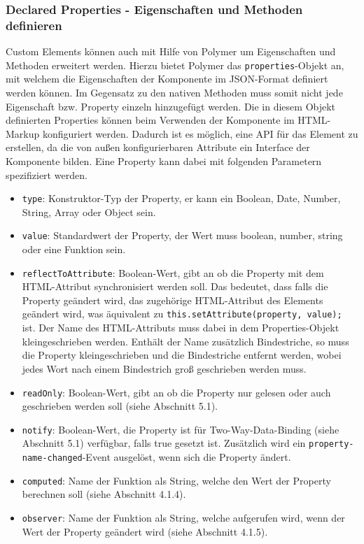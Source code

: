 \documentclass[]{article}
\providecommand{\tightlist}{%
  \setlength{\itemsep}{0pt}\setlength{\parskip}{0pt}}
\begin{document}
\subsubsection{Declared Properties - Eigenschaften und Methoden
definieren}\label{declared-properties---eigenschaften-und-methoden-definieren}

Custom Elements können auch mit Hilfe von Polymer um Eigenschaften und
Methoden erweitert werden. Hierzu bietet Polymer das
\texttt{properties}-Objekt an, mit welchem die Eigenschaften der
Komponente im JSON-Format definiert werden können. Im Gegensatz zu den
nativen Methoden muss somit nicht jede Eigenschaft bzw. Property einzeln
hinzugefügt werden. Die in diesem Objekt definierten Properties können
beim Verwenden der Komponente im HTML-Markup konfiguriert werden.
Dadurch ist es möglich, eine API für das Element zu erstellen, da die
von außen konfigurierbaren Attribute ein Interface der Komponente
bilden. Eine Property kann dabei mit folgenden Parametern spezifiziert
werden.

\begin{itemize}
\tightlist
\item
  \texttt{type}: Konstruktor-Typ der Property, er kann ein Boolean,
  Date, Number, String, Array oder Object sein.
\item
  \texttt{value}: Standardwert der Property, der Wert muss boolean,
  number, string oder eine Funktion sein.
\item
  \texttt{reflectToAttribute}: Boolean-Wert, gibt an ob die Property mit
  dem HTML-Attribut synchronisiert werden soll. Das bedeutet, dass falls
  die Property geändert wird, das zugehörige HTML-Attribut des Elements
  geändert wird, was äquivalent zu
  \texttt{this.setAttribute(property,\ value);} ist. Der Name des
  HTML-Attributs muss dabei in dem Properties-Objekt kleingeschrieben
  werden. Enthält der Name zusätzlich Bindestriche, so muss die Property
  kleingeschrieben und die Bindestriche entfernt werden, wobei jedes
  Wort nach einem Bindestrich groß geschrieben werden muss.
\item
  \texttt{readOnly}: Boolean-Wert, gibt an ob die Property nur gelesen
  oder auch geschrieben werden soll (siehe Abschnitt 5.1).
\item
  \texttt{notify}: Boolean-Wert, die Property ist für
  Two-Way-Data-Binding (siehe Abschnitt 5.1) verfügbar, falls true
  gesetzt ist. Zusätzlich wird ein \texttt{property-name-changed}-Event
  ausgelöst, wenn sich die Property ändert.
\item
  \texttt{computed}: Name der Funktion als String, welche den Wert der
  Property berechnen soll (siehe Abschnitt 4.1.4).
\item
  \texttt{observer}: Name der Funktion als String, welche aufgerufen
  wird, wenn der Wert der Property geändert wird (siehe Abschnitt
  4.1.5).
\end{itemize}
\end{document}
